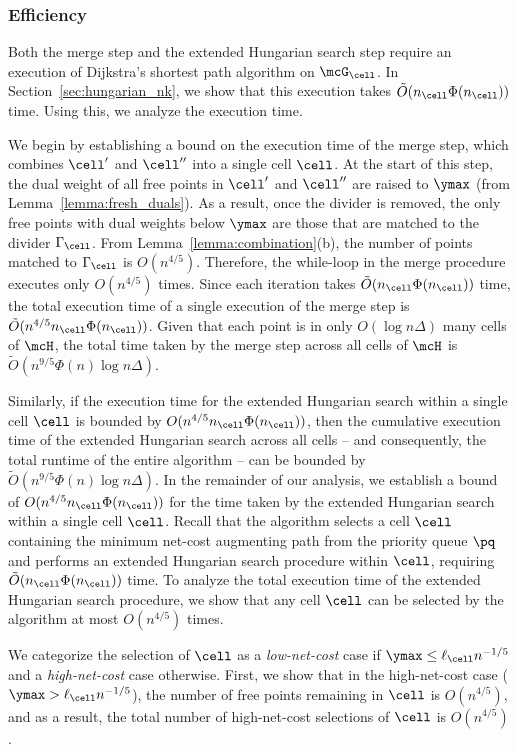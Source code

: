\subsubsection{Efficiency}\label{subsec:efficiency}

Both the merge step and the extended Hungarian search step require an execution of Dijkstra's shortest path algorithm on $\mcG_\cell$. In Section~\ref{sec:hungarian_nk}, we show that this execution takes $\tilde{O}(n_\cell\Phi(n_\cell))$ time. Using this, we analyze the execution time.

We begin by establishing a bound on the execution time of the merge step, which combines $\cell'$ and $\cell''$ into a single cell $\cell$. At the start of this step, the dual weight of all free points in $\cell'$ and $\cell''$ are raised to $\ymax$ (from Lemma~\ref{lemma:fresh_duals}). As a result, once the divider is removed, the only free points with dual weights below $\ymax$ are those that are matched to the divider $\Gamma_\cell$.  From Lemma~\ref{lemma:combination}(b), the number of points matched to $\Gamma_\cell$ is $O(n^{4/5})$. Therefore, the while-loop in the merge procedure executes only $O(n^{4/5})$ times. Since each iteration takes $\tilde{O}(n_\cell\Phi(n_\cell))$ time, the total execution time of a single execution of the merge step is $\tilde{O}(n^{4/5}n_\cell \Phi(n_\cell))$. 
Given that each point is in only $O(\log n\Delta)$ many cells of $\mcH$, the total time taken by the merge step across all cells of $\mcH$ is $\tilde{O}(n^{9/5}\Phi(n)\log n\Delta)$.

Similarly, if the execution time for the extended Hungarian search within a single cell $\cell$ is bounded by $O(n^{4/5}n_\cell \Phi(n_\cell))$, then the cumulative execution time of the extended Hungarian search across all cells -- and consequently, the total runtime of the entire algorithm -- can be bounded by $\tilde{O}(n^{9/5}\Phi(n)\log n\Delta)$.
In the remainder of our analysis, we establish a bound of $O(n^{4/5}n_\cell \Phi(n_\cell))$ for the time taken by the extended Hungarian search within a single cell $\cell$.
Recall that the algorithm selects a cell $\cell$ containing the minimum net-cost augmenting path from the priority queue $\pq$ and performs an extended Hungarian search procedure within $\cell$, requiring $\tilde{O}(n_\cell\Phi(n_\cell))$ time. To analyze the total execution time of the extended Hungarian search procedure, we show that any cell $\cell$ can be selected by the algorithm at most $O(n^{4/5})$ times.

We categorize the selection of $\cell$ as a \emph{low-net-cost} case if $\ymax\le \ell_\cell n^{-1/5}$ and a \emph{high-net-cost} case otherwise. First, we show that in the high-net-cost case ($\ymax>\ell_\cell n^{-1/5}$), the number of free points remaining in $\cell$ is $O(n^{4/5})$, and as a result, the total number of high-net-cost selections of $\cell$ is $O(n^{4/5})$.

